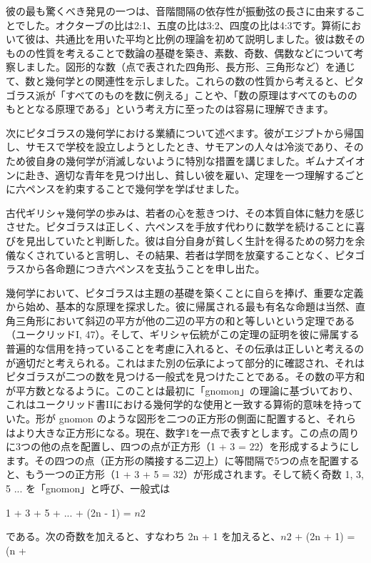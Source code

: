 \documentclass[a4paper,11pt,openany]{ltjsbook}
\begin{document}
彼の最も驚くべき発見の一つは、音階間隔の依存性が振動弦の長さに由来することでした。オクターブの比は2:1、五度の比は3:2、四度の比は4:3です。算術において彼は、共通比を用いた平均と比例の理論を初めて説明しました。彼は数そのものの性質を考えることで数論の基礎を築き、素数、奇数、偶数などについて考察しました。図形的な数（点で表された四角形、長方形、三角形など）を通じて、数と幾何学との関連性を示しました。これらの数の性質から考えると、ピタゴラス派が「すべてのものを数に例える」ことや、「数の原理はすべてのもののもととなる原理である」という考え方に至ったのは容易に理解できます。

次にピタゴラスの幾何学における業績について述べます。彼がエジプトから帰国し、サモスで学校を設立しようとしたとき、サモアンの人々は冷淡であり、そのため彼自身の幾何学が消滅しないように特別な措置を講じました。ギムナズイオンに赴き、適切な青年を見つけ出し、貧しい彼を雇い、定理を一つ理解するごとに六ペンスを約束することで幾何学を学ばせました。

古代ギリシャ幾何学の歩みは、若者の心を惹きつけ、その本質自体に魅力を感じさせた。ピタゴラスは正しく、六ペンスを手放す代わりに数学を続けることに喜びを見出していたと判断した。彼は自分自身が貧しく生計を得るための努力を余儀なくされていると言明し、その結果、若者は学問を放棄することなく、ピタゴラスから各命題につき六ペンスを支払うことを申し出た。

幾何学において、ピタゴラスは主題の基礎を築くことに自らを捧げ、重要な定義から始め、基本的な原理を探求した。彼に帰属される最も有名な命題は当然、直角三角形において斜辺の平方が他の二辺の平方の和と等しいという定理である（ユークリッドI, 47）。そして、ギリシャ伝統がこの定理の証明を彼に帰属する普遍的な信用を持っていることを考慮に入れると、その伝承は正しいと考えるのが適切だと考えられる。これはまた別の伝承によって部分的に確認され、それはピタゴラスが二つの数を見つける一般式を見つけたことである。その数の平方和が平方数となるように。このことは最初に「gnomon」の理論に基づいており、これはユークリッド書IIにおける幾何学的な使用と一致する算術的意味を持っていた。形が gnomon のような図形を二つの正方形の側面に配置すると、それらはより大きな正方形になる。現在、数字1を一点で表すとします。この点の周りに3つの他の点を配置し、四つの点が正方形（1 + 3 = $2{2}$）を形成するようにします。その四つの点（正方形の隣接する二辺上）に等間隔で5つの点を配置すると、もう一つの正方形（1 + 3 + 5 = $3{2}$）が形成されます。そして続く奇数 1, 3, 5 ... を「gnomon」と呼び、一般式は

1 + 3 + 5 + ... + (2n - 1) = $n{2}$

である。次の奇数を加えると、すなわち 2n + 1 を加えると、$n{2}$ + (2n + 1) = (n +
\end{document}
